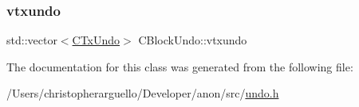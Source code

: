 \mbox{\label{class_c_block_undo_ad0baf7a4d3634b27b4affac2e7cf75c9}} 
\subsubsection{\texorpdfstring{vtxundo}{vtxundo}}
{\footnotesize\ttfamily std\+::vector$<$\mbox{\hyperlink{class_c_tx_undo}{C\+Tx\+Undo}}$>$ C\+Block\+Undo\+::vtxundo}



The documentation for this class was generated from the following file\+:\begin{DoxyCompactItemize}
\item 
/\+Users/christopherarguello/\+Developer/anon/src/\mbox{\hyperlink{undo_8h}{undo.\+h}}\end{DoxyCompactItemize}
